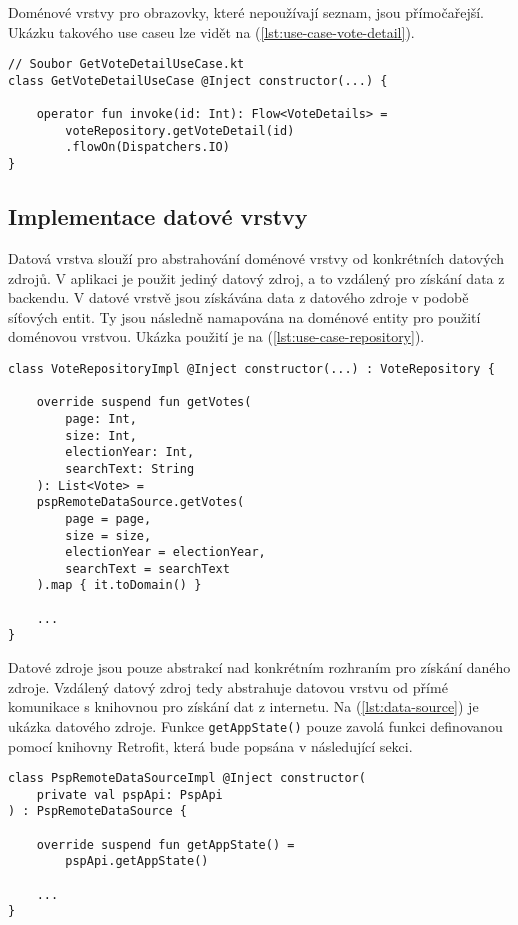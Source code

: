 \noindent Doménové vrstvy pro obrazovky, které nepoužívají seznam, jsou přímočařejší. Ukázku takového use caseu lze vidět na (\ref{lst:use-case-vote-detail}).

\begin{lstlisting}[caption={Ukázka využití use caseu pro získání detailu hlasování}, label={lst:use-case-vote-detail}, tabsize=2]
// Soubor GetVoteDetailUseCase.kt
class GetVoteDetailUseCase @Inject constructor(...) {
	
	operator fun invoke(id: Int): Flow<VoteDetails> =
		voteRepository.getVoteDetail(id)
		.flowOn(Dispatchers.IO)	
}
\end{lstlisting}

\subsection {Implementace datové vrstvy}
Datová vrstva slouží pro abstrahování doménové vrstvy od konkrétních datových zdrojů. V aplikaci je použit jediný datový zdroj, a to vzdálený pro získání data z backendu. V datové vrstvě jsou získávána data z datového zdroje v podobě síťových entit. Ty jsou následně namapována na doménové entity pro použití doménovou vrstvou. Ukázka použití je na (\ref{lst:use-case-repository}).

\begin{lstlisting}[caption={Ukázka datové vrstvy pro data o hlasováních}, label={lst:use-case-repository}, tabsize=2]
class VoteRepositoryImpl @Inject constructor(...) : VoteRepository {
	
	override suspend fun getVotes(
		page: Int,
		size: Int,
		electionYear: Int,
		searchText: String
	): List<Vote> =
	pspRemoteDataSource.getVotes(
		page = page,
		size = size,
		electionYear = electionYear,
		searchText = searchText
	).map { it.toDomain() }
	
	...
}
\end{lstlisting}

\vspace{10px}
\noindent Datové zdroje jsou pouze abstrakcí nad konkrétním rozhraním pro získání daného zdroje. Vzdálený datový zdroj tedy abstrahuje datovou vrstvu od přímé komunikace s knihovnou pro získání dat z internetu. Na (\ref{lst:data-source}) je ukázka datového zdroje. Funkce \lstinline|getAppState()| pouze zavolá funkci definovanou pomocí knihovny Retrofit, která bude popsána v následující sekci.

\begin{lstlisting}[caption={Ukázka datového zdroje}, label={lst:data-source}, tabsize=2]
class PspRemoteDataSourceImpl @Inject constructor(
	private val pspApi: PspApi
) : PspRemoteDataSource {
	
	override suspend fun getAppState() = 
		pspApi.getAppState()
		
	...
}
\end{lstlisting}

